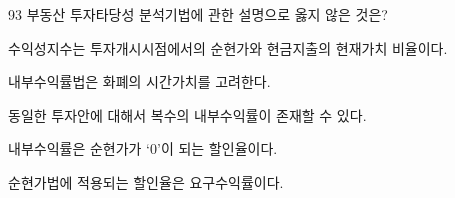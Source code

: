 \begin{question}{93}
부동산 투자타당성 분석기법에 관한 설명으로 옳지 않은 것은?
\begin{choices}
  \item 수익성지수는 투자개시시점에서의 순현가와 현금지출의 현재가치 비율이다.
  \item 내부수익률법은 화폐의 시간가치를 고려한다.
  \item 동일한 투자안에 대해서 복수의 내부수익률이 존재할 수 있다.
  \item 내부수익률은 순현가가 ‘0’이 되는 할인율이다.
  \item 순현가법에 적용되는 할인율은 요구수익률이다.
\end{choices}
\end{question}
